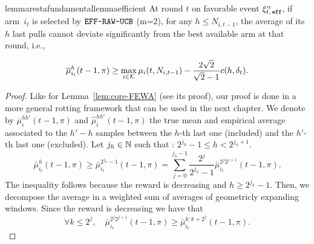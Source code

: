 \begin{restatable}{lemma}{restafundamentallemmaefficient}
\label{fundamental-lemma_efficient}
At round $t$ on favorable event $\xi^\alpha_{t,\, \texttt{eff}}$, if arm~$i_{t}$ is selected by $\normalfont \texttt{EFF-RAW-UCB}$ (m=2), for any $h \leq N_{i,t-1}$,  the average of its $h$ last pulls cannot deviate significantly from the best available arm at that round, i.e.,

\vspace{-4pt}
\begin{equation*}
\overline{\mu}^{h}_{i_{t}}(t-1,\pi) \geq \max_{i \in \mathcal{K}}\mu_i(t,N_{i,t-1}) - \frac{2\sqrt{2}}{\sqrt{2}-1} c(h, \delta_{t}).
\end{equation*}
\end{restatable}
\begin{proof}
Like for Lemma~\ref{lem:core-FEWA} (see its proof), our proof is done in a more general rotting framework that can be used in the next chapter. We denote by $\bar{\mu}^{hh'}_i(t-1,\pi)$ and $\hat{\mu}^{hh'}_i(t-1,\pi)$ the true mean and empirical average associated to the $h'-h$ samples between the $h$-th last one (included) and the $h'$-th last one (excluded). Let $j_h \in {\mathbb N}$ such that :
$2^{j_h} -1 \leq  h < 2^{j_h+1}$.
\begin{equation}
\label{eq:eff-decompo}
\bar{\mu}^{h}_{i_t}(t-1,\pi) \geq \bar{\mu}^{2^{j_h}-1}_{i_t}(t-1,\pi) = \sum_{j=0}^{j_h-1} \frac{2^j}{2^{j_h}-1} \bar{\mu}^{2^{j}2^{j+1}}_{i_t}(t-1,\pi).
\end{equation}
The inequality follows because the reward is decreasing and $h\geq 2^{j_h}-1$. Then, we decompose the average in a weighted sum of averages of geometricly expanding windows. Since the reward is decreasing we have that 
\begin{equation*}
\forall k \leq 2^j, \quad \bar{\mu}^{2^{j}2^{j+1}}_{i_t}(t-1,\pi) \geq \bar{\mu}^{k : k+2^{j}}_{i_t}(t-1,\pi).
\end{equation*}


\end{proof}
